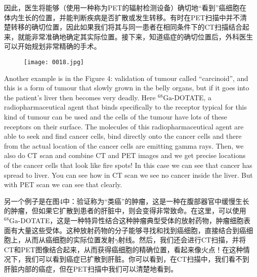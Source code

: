 \documentclass[dvipsnames, svgnames,a4paper,11pt]{article}
\begin{document}
因此，医生将能够（使用一种称为PET的辐射检测设备）确切地“看到”癌细胞在体内生长的位置，并能判断疾病是否扩散或发生转移。有时在PET扫描中并不清楚转移的确切位置，因此如果我们将其与同一患者在相同条件下的CT扫描结合起来，就能非常准确地确定其实际位置。接下来，知道癌症的确切位置后，外科医生可以开始规划非常精确的手术。

\begin{figure}[htbp]
      \centering
      \texttt{[image: 0018.jpg]}
       \label{fig4}
  \end{figure}

Another example is in the Figure 4: validation of tumour called “carcinoid”, and this is a form of tumour that slowly grown in the belly organs, but if it goes into the patient’s liver then becomes very deadly. Here ${}^\text{68}\text{Ga}$-DOTATE, a radiopharmaceutical agent that binds specifically to the receptor typical for this kind of tumour can be used and the cells of the tumour have lots of these receptors on their surface. The molecules of this radiopharmaceutical agent are able to seek and find cancer cells, bind directly onto the cancer cells and there from the actual location of the cancer cells are emitting gamma rays. Then, we also do CT scan and combine CT and PET images and we get precise locations of the cancer cells that look like fire spots! In this case we can see that cancer has spread to liver. You can see how in CT scan we see no cancer inside the liver. But with PET scan we can see that clearly.

另一个例子是在图4中：验证称为“类癌”的肿瘤，这是一种在腹部器官中缓慢生长的肿瘤，但如果它扩散到患者的肝脏中，则会变得非常致命。在这里，可以使用${}^\text{68}\text{Ga}$-DOTATE，这是一种特异性结合这种肿瘤典型受体的放射药物，肿瘤细胞表面有大量这些受体。这种放射药物的分子能够寻找和找到癌细胞，直接结合到癌细胞上，从而从癌细胞的实际位置发射$\gamma$射线。然后，我们还会进行CT扫描，并将CT和PET图像结合起来，从而获得癌细胞的精确位置，看起来像火点！在这种情况下，我们可以看到癌症已扩散到肝脏。你可以看到，在CT扫描中，我们看不到肝脏内部的癌症，但在PET扫描中我们可以清楚地看到。
\end{document}

